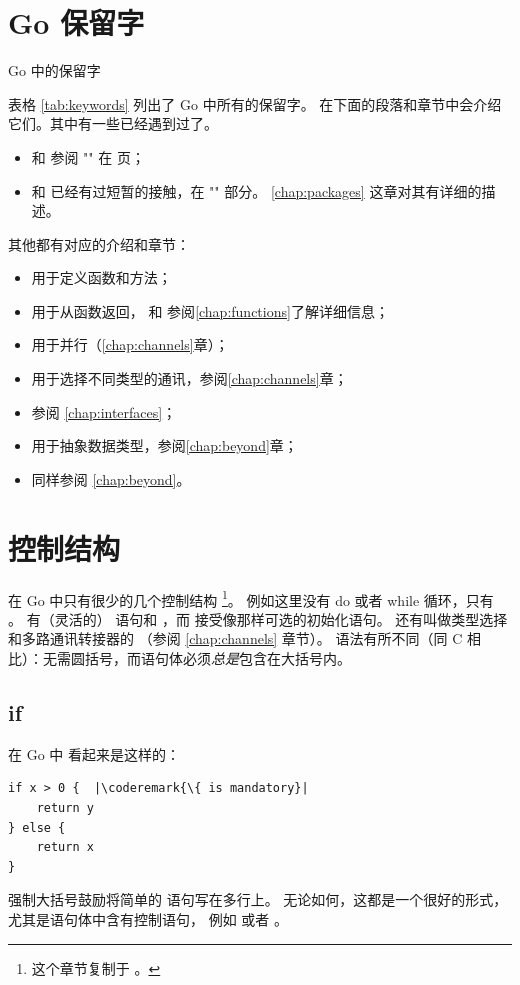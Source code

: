 \section{Go 保留字}
\begin{table}[H]
\begin{center}
\caption{Go 中的保留字}
\label{tab:keywords}

\end{center}
\end{table}
表格 \ref{tab:keywords} 列出了 Go 中所有的保留字。
在下面的段落和章节中会介绍它们。其中有一些已经遇到过了。
\begin{itemize}
\item {} 和  参阅 "" 在 \pageref{sec:vars} 页；
\item {} 和  已经有过短暂的接触，在 "" 部分。 
\ref{chap:packages} 这章对其有详细的描述。
\end{itemize}
其他都有对应的介绍和章节：
\begin{itemize}
\item {} 用于定义函数和方法；
\item {} 用于从函数返回， 和 
参阅\ref{chap:functions}了解详细信息；
\item {} 用于并行（\ref{chap:channels}章）；
\item {} 用于选择不同类型的通讯，参阅\ref{chap:channels}章；
\item {} 参阅 \ref{chap:interfaces}；
\item {} 用于抽象数据类型，参阅\ref{chap:beyond}章；
\item {} 同样参阅 \ref{chap:beyond}。
\end{itemize}

\section{控制结构}
在 Go 中只有很少的几个控制结构
\footnote{这个章节复制于 \cite{effective_go}。}。
例如这里没有 do 或者 while 循环，只有 。
有（灵活的） 语句和 ，而
 接受像那样可选的初始化语句。
还有叫做类型选择和多路通讯转接器的  （参阅 \ref{chap:channels} 章节）。
语法有所不同（同 C 相比）：无需圆括号，而语句体必须\emph{总是}包含在大括号内。

\subsection{if}
在 Go 中  看起来是这样的：
\begin{lstlisting}
if x > 0 {	|\coderemark{\{ is mandatory}|
    return y
} else {
    return x
}
\end{lstlisting}
强制大括号鼓励将简单的  语句写在多行上。
无论如何，这都是一个很好的形式，尤其是语句体中含有控制语句，
例如  或者 。

